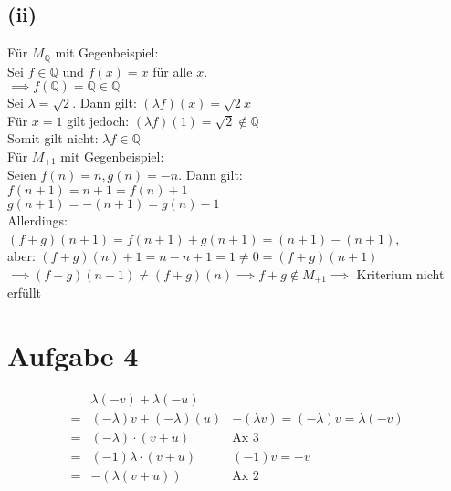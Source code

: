 \documentclass{article}
\begin{document}
\subsection*{(ii)}
Für $M_{\mathbb{Q}}$ mit Gegenbeispiel: \\
\newline
Sei $f \in \mathbb{Q}$ und $f(x) = x$ für alle $x$. \\
$\implies f(\mathbb{Q}) = \mathbb{Q} \in \mathbb{Q}$ \\
\newline
Sei $\lambda = \sqrt 2$. Dann gilt: $(\lambda f)(x) = \sqrt 2 x$ \\
Für $x = 1$ gilt jedoch: $(\lambda f)(1) = \sqrt 2 \notin \mathbb{Q}$ \\
\newline
Somit gilt nicht: $\lambda f \in \mathbb{Q}$ \\
\newline
Für $M_{+1}$ mit Gegenbeispiel: \\
\newline
Seien $f(n) = n, g(n) = -n$. Dann gilt: \\
$f(n+1) = n + 1 = f(n) + 1$ \\
$g(n+1) = -(n + 1) = g(n) - 1$ \\
Allerdings: \\
$(f+g)(n+1) = f(n+1) + g(n+1) = (n + 1) - (n+1)$, \\
aber: $(f+g)(n) + 1 = n - n + 1 = 1 \neq 0 = (f+g)(n+1)$ \\
$\implies (f+g)(n+1) \neq (f+g)(n) \implies f+g \notin M_{+1} \implies$ Kriterium nicht erfüllt 

\section*{Aufgabe 4}
\begin{align*}
    &\lambda(-v) + \lambda(-u) \\
    =& (-\lambda)v + (-\lambda)(u) & -(\lambda v) = (-\lambda)v = \lambda(-v) \\
    =& (-\lambda) \cdot (v+u) & \text{Ax 3} \\
    =& (-1)\lambda \cdot (v+u) & (-1)v = -v \\
    =& -(\lambda(v+u)) & \text{Ax 2}
\end{align*}
\end{document}
